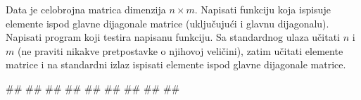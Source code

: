 \begin{Answer}[ref=2_19]
\end{Answer}

\begin{Exercise}[label=2_20]
Data je celobrojna matrica dimenzija $n \times m$.
Napisati funkciju koja ispisuje elemente ispod glavne dijagonale matrice 
(uključujući i glavnu dijagonalu).
Napisati program koji testira napisanu funkciju. Sa standardnog
ulaza učitati $n$ i $m$ (ne praviti nikakve
pretpostavke o njihovoj veličini), zatim učitati elemente
matrice i na standardni izlaz ispisati elemente ispod glavne
dijagonale matrice.

\begin{miditest}
\begin{upotreba}{1}
#\naslovInt#
##
##
##
##
##
##
##
##
\end{upotreba}
\end{miditest}

\end{Exercise}
\begin{Answer}[ref=2_20]
\end{Answer}

